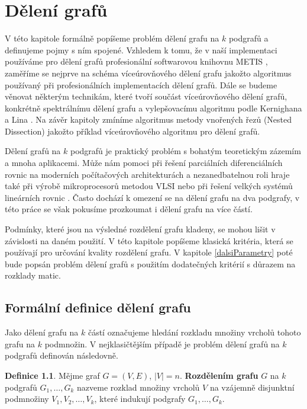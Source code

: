 \documentclass{ctuthesis}
\theoremstyle{plain}
\theoremstyle{definition}
\newtheorem{definition}{Definice}
\begin{document}

\chapter{Dělení grafů}

V této kapitole formálně popíšeme problém dělení grafu na $k$ podgrafů a definujeme pojmy s ním spojené. Vzhledem k tomu, že v naší implementaci používáme pro dělení grafů profesionální softwarovou knihovnu METIS \cite{kary:13}, zaměříme se nejprve na schéma víceúrovňového dělení grafu jakožto algoritmus používaný při profesionálních implementacích dělení grafů. Dále se budeme věnovat některým technikám, které tvoří součást víceúrovňového dělení grafů, konkrétně spektrálnímu dělení grafu a vylepšovacímu algoritmu podle Kernighana a Lina \cite{keli:70}. Na závěr kapitoly zmíníme algoritmus metody vnořených řezů (Nested Dissection) jakožto příklad víceúrovňového algoritmu pro dělení grafů.

Dělení grafů na $k$ podgrafů je praktický problém s bohatým teoretickým zázemím a mnoha aplikacemi. Může nám pomoci při řešení parciálních diferenciálních rovnic na moderních počítačových architekturách \cite{posl:90} a nezanedbatelnou roli hraje také při výrobě mikroprocesorů metodou VLSI nebo při řešení velkých systémů lineárních rovnic \cite{keli:70, pis:84}. Často dochází k omezení se na dělení grafu na dva podgrafy, v této práce se však pokusíme prozkoumat i dělení grafu na více částí.

Podmínky, které jsou na výsledné rozdělení grafu kladeny, se mohou lišit v závislosti na daném použití. V této kapitole popíšeme klasická kritéria, která se používají pro určování kvality rozdělení grafu. V kapitole \ref{dalsiParametry} poté bude popsán problém dělení grafů s použitím dodatečných kritérií s důrazem na rozklady matic.

\section{Formální definice dělení grafu}

Jako dělení grafu na $k$ částí označujeme hledání rozkladu množiny vrcholů tohoto grafu na $k$ podmnožin. V nejklasičtějším případě je problém dělení grafů na $k$ podgrafů definován následovně.
\begin{definition}
  Mějme graf $G=(V,E)$, $|V| = n$. \textbf{Rozdělením grafu} $G$ na $k$ podgrafů $G_1, \ldots, G_k$ nazveme rozklad množiny vrcholů $V$ na vzájemně disjunktní podmnožiny $V_1, V_2, \ldots, V_k$, které indukují podgrafy $G_1, \ldots, G_k$.   
\end{definition}
\end{document}
